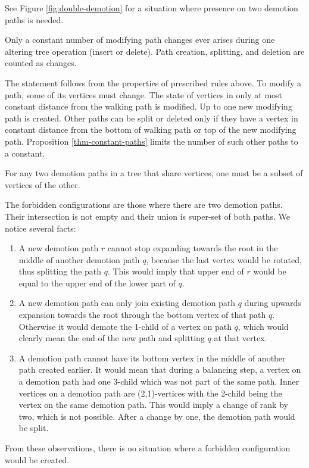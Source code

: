 See Figure \ref{fig:double-demotion} for a situation where presence on two demotion paths is needed.


\begin{prop}
Only a constant number of modifying path changes ever arises during one altering tree operation (insert or delete). Path creation, splitting, and deletion are counted as changes.
\end{prop}

\begin{myproof}
The statement follows from the properties of prescribed rules above. To modify a path, some of its vertices must change. The state of vertices in only at most constant distance from the walking path is modified. Up to one new modifying path is created. Other paths can be split or deleted only if they have a vertex in constant distance from the bottom of walking path or top of the new modifying path. Proposition \ref{thm-constant-paths} limits the number of such other paths to a constant.
\end{myproof}

\begin{prop}
For any two demotion paths in a tree that share vertices, one must be a subset of vertices of the other.
\end{prop}

\begin{myproof}
The forbidden configurations are those where there are two demotion paths. Their intersection is not empty and their union is super-set of both paths. We notice several facts: 

\begin{enumerate}
\item A new demotion path $r$ cannot stop expanding towards the root in the middle of another demotion path $q$, because the last vertex would be rotated, thus splitting the path $q$. 
This would imply that upper end of $r$ would be equal to the upper end of the lower part of $q$.

\item A new demotion path can only join existing demotion path $q$ during upwards expansion towards the root through the bottom vertex of that path $q$. 
Otherwise it would demote the 1-child of a vertex on path $q$, which would clearly mean the end of the new path and splitting $q$ at that vertex. 

\item A demotion path cannot have its bottom vertex in the middle of another path created earlier. 
It would mean that during a balancing step, a vertex on a demotion path had one 3-child which was not part of the same path. 
Inner vertices on a demotion path are (2,1)-vertices with the 2-child being the vertex on the same demotion path. 
This would imply a change of rank by two, which is not possible. After a change by one, the demotion path would be split.
\end{enumerate}
From these observations, there is no situation where a forbidden configuration would be created. 
\end{myproof}

